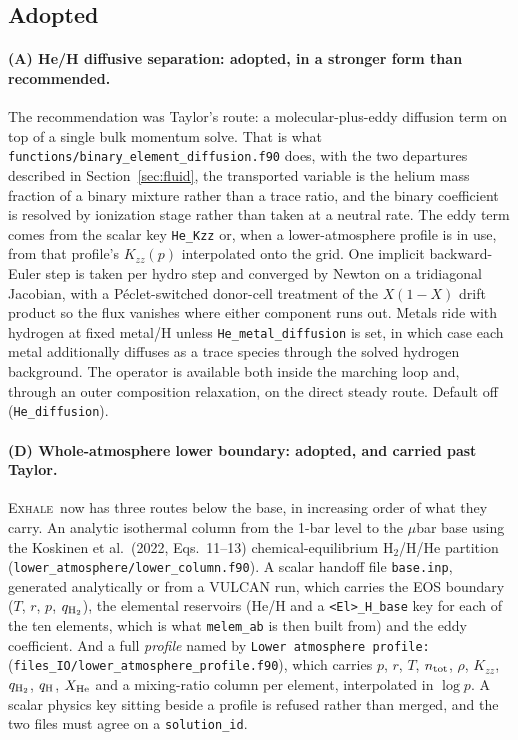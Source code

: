 \documentclass[english,a4paper]{my_memo}
\newcommand{\EXHALE}{\textsc{Exhale}}
\newcommand{\Kzz}{K_{zz}}
\begin{document}
\subsection{Adopted}

\paragraph{(A) He/H diffusive separation: adopted, in a stronger form than
recommended.} The recommendation was Taylor's route: a molecular-plus-eddy
diffusion term on top of a single bulk momentum solve. That is what
\texttt{functions/binary\_element\_diffusion.f90} does, with the two departures
described in Section~\ref{sec:fluid}, the transported variable is the helium mass
fraction of a binary mixture rather than a trace ratio, and the binary
coefficient is resolved by ionization stage rather than taken at a neutral
rate. The eddy term comes from the scalar key \texttt{He\_Kzz} or, when a
lower-atmosphere profile is in use, from that profile's $\Kzz(p)$ interpolated
onto the grid. One implicit backward-Euler step is taken per hydro step and
converged by Newton on a tridiagonal Jacobian, with a P\'eclet-switched
donor-cell treatment of the $X(1-X)$ drift product so the flux vanishes where
either component runs out. Metals ride with hydrogen at fixed metal/H unless
\texttt{He\_metal\_diffusion} is set, in which case each metal additionally
diffuses as a trace species through the solved hydrogen background. The
operator is available both inside the marching loop and, through an outer
composition relaxation, on the direct steady route. Default off
(\texttt{He\_diffusion}).

\paragraph{(D) Whole-atmosphere lower boundary: adopted, and carried past
Taylor.} \EXHALE\ now has three routes below the base, in increasing order of
what they carry. An analytic isothermal column from the 1-bar level to the
$\mu$bar base using the Koskinen et al.\ (2022, Eqs.~11--13) chemical-equilibrium
H$_2$/H/He partition (\texttt{lower\_atmosphere/lower\_column.f90}). A scalar
handoff file \texttt{base.inp}, generated analytically or from a VULCAN run,
which carries the EOS boundary ($T$, $r$, $p$, $q_{\rm H_2}$), the elemental
reservoirs (He/H and a \texttt{<El>\_H\_base} key for each of the ten
elements, which is what \texttt{melem\_ab} is then built from) and the eddy
coefficient. And a full \emph{profile} named by
\texttt{Lower atmosphere profile:}
(\texttt{files\_IO/lower\_atmosphere\_profile.f90}), which carries
$p$, $r$, $T$, $n_{\rm tot}$, $\rho$, $\Kzz$, $q_{\rm H_2}$, $q_{\rm H}$,
$X_{\rm He}$ and a mixing-ratio column per element, interpolated in $\log p$.
A scalar physics key sitting beside a profile is refused rather than merged,
and the two files must agree on a \texttt{solution\_id}.
\end{document}
